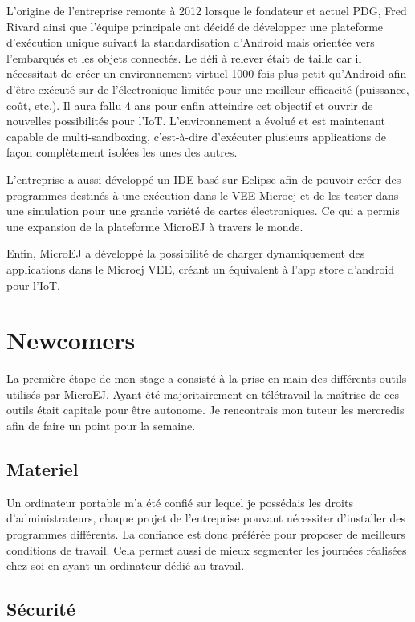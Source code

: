 \documentclass[french,a4paper,12pt]{report}
\begin{document}
L’origine de l’entreprise remonte à 2012 lorsque le fondateur et actuel PDG, Fred Rivard ainsi que l’équipe principale ont décidé de développer une plateforme d’exécution unique suivant la standardisation d’Android mais orientée vers l'embarqués et les objets connectés. Le défi à relever était de taille car il nécessitait de créer un environnement virtuel 1000 fois plus petit qu’Android afin d’être exécuté sur de l’électronique limitée pour une meilleur efficacité (puissance, coût, etc.). Il aura fallu 4 ans pour enfin atteindre cet objectif et ouvrir de nouvelles possibilités pour l’IoT. 
L'environnement a évolué et est maintenant capable de multi-sandboxing, c'est-à-dire d’exécuter plusieurs applications de façon complètement isolées les unes des autres.

L’entreprise a aussi développé un IDE basé sur Eclipse afin de pouvoir créer des programmes destinés à une exécution dans le VEE Microej et de les tester dans une simulation pour une grande variété de cartes électroniques. Ce qui a permis une expansion de la plateforme MicroEJ à travers le monde.

Enfin, MicroEJ a développé la possibilité de charger dynamiquement des applications dans le Microej VEE, créant un équivalent à l'app store d'android pour l'IoT. 

\chapter{Newcomers}

La première étape de mon stage a consisté à la prise en main des différents outils utilisés par MicroEJ. Ayant été majoritairement en télétravail la maîtrise de ces outils était capitale pour être autonome. Je rencontrais mon tuteur les mercredis afin de faire un point pour la semaine.

\section{Materiel} 

Un ordinateur portable m’a été confié sur lequel je possédais les droits d’administrateurs, chaque projet de l’entreprise pouvant nécessiter d’installer des programmes différents. La confiance est donc préférée pour proposer de meilleurs conditions de travail. Cela permet aussi de mieux segmenter les journées réalisées chez soi en ayant un ordinateur dédié au travail.

\section{Sécurité}
\end{document}
